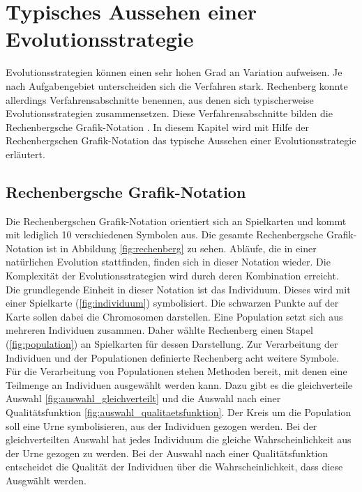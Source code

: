 \section{Typisches Aussehen einer Evolutionsstrategie}
Evolutionsstrategien können einen sehr hohen Grad an Variation aufweisen. Je nach Aufgabengebiet unterscheiden sich die Verfahren stark.
Rechenberg konnte allerdings Verfahrensabschnitte benennen, aus denen sich typischerweise Evolutionsstrategien zusammensetzen.
Diese Verfahrensabschnitte bilden die Rechenbergsche Grafik-Notation \cite[S.144-146]{schoeneburg}. In diesem Kapitel wird mit Hilfe der Rechenbergschen Grafik-Notation das typische Aussehen einer Evolutionsstrategie erläutert.

\subsection{Rechenbergsche Grafik-Notation}
Die  Rechenbergschen Grafik-Notation orientiert sich an Spielkarten und kommt mit lediglich 10 verschiedenen Symbolen aus.
Die gesamte Rechenbergsche Grafik-Notation ist in Abbildung \ref{fig:rechenberg} zu sehen. Abläufe, die in einer natürlichen Evolution stattfinden, finden sich in dieser Notation wieder.
Die Komplexität der Evolutionsstrategien wird durch deren Kombination erreicht.\\
Die grundlegende Einheit in dieser Notation ist das Individuum. Dieses wird mit einer Spielkarte (\ref{fig:individuum}) symbolisiert. Die schwarzen Punkte auf der Karte sollen dabei die Chromosomen darstellen.
Eine Population setzt sich aus mehreren Individuen zusammen. Daher wählte Rechenberg einen Stapel (\ref{fig:population}) an Spielkarten für dessen Darstellung. Zur Verarbeitung der Individuen und der Populationen definierte Rechenberg acht weitere Symbole.
Für die Verarbeitung von Populationen stehen Methoden bereit, mit denen eine Teilmenge an Individuen ausgewählt werden kann. Dazu gibt es die gleichverteile Auswahl \ref{fig:auswahl_gleichverteilt} und die Auswahl nach einer Qualitätsfunktion \ref{fig:auswahl_qualitaetsfunktion}.
Der Kreis um die Population soll eine Urne symbolisieren, aus der Individuen gezogen werden. Bei der gleichverteilten Auswahl hat jedes Individuum die gleiche Wahrscheinlichkeit aus der Urne gezogen zu werden. Bei der Auswahl nach einer Qualitätsfunktion entscheidet die Qualität der Individuen über die Wahrscheinlichkeit, dass diese Ausgwählt werden.
